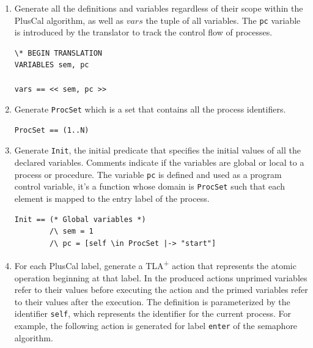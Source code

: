\documentclass{thesul}
\newcommand{\tlaplus}{TLA\textsuperscript{+}\xspace}
\begin{document}
\begin{enumerate}
\item Generate all the definitions and variables regardless of their scope within the PlusCal algorithm, as well as $vars$ the tuple of all variables.
The \verb|pc| variable is introduced by the translator to track the control flow of processes.

\FloatBarrier
\begin{lstlisting}[frame = tlrb, firstnumber = 1,xleftmargin=.2\textwidth, xrightmargin=.2\textwidth]
\* BEGIN TRANSLATION
VARIABLES sem, pc

vars == << sem, pc >>

\end{lstlisting}

\item Generate \verb|ProcSet| which is a set that contains all the process identifiers.

\begin{lstlisting}[frame = tlrb, firstnumber = 1,xleftmargin=.2\textwidth, xrightmargin=.2\textwidth]
ProcSet == (1..N)

\end{lstlisting}

\item  Generate \verb|Init|, the initial predicate that specifies the initial values of all the declared variables. Comments indicate if the variables are global or local to a process or procedure.
The variable \verb|pc| is defined and used as a program control variable, it's a function whose domain is \verb|ProcSet| such that each element is mapped to the entry label of the process.

\begin{lstlisting}[frame = tlrb, firstnumber = 1, xleftmargin=.2\textwidth, xrightmargin=.2\textwidth]
Init == (* Global variables *)
        /\ sem = 1
        /\ pc = [self \in ProcSet |-> "start"]

\end{lstlisting}

\item For each PlusCal label, generate a \tlaplus action that represents the atomic operation beginning at that label. 
In the produced actions unprimed variables refer to their values before executing the action and the primed variables refer to their values after the execution.
The definition is parameterized by the identifier \verb|self|,
which represents the identifier for the current process. For example, the following action is generated for label \texttt{enter} of the semaphore algorithm.


\end{enumerate}
\end{document}
